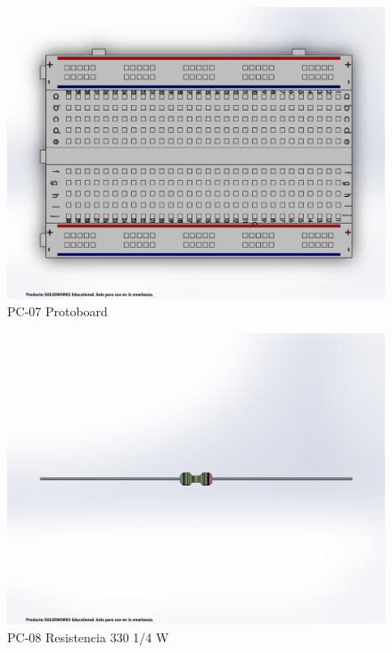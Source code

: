     \begin{figure}[H]
        \centering
        \includegraphics[trim = {1mm 10mm 1mm 1mm},clip,scale=0.2]{3/Img/protoboardFigura.PDF}
        \caption{PC-07 Protoboard}
        \label{fig:protoboardFigura}
    \end{figure}
    \begin{figure}[H]
        \centering
        \includegraphics[trim = {1mm 50mm 1mm 50mm},clip,scale=0.2]{3/Img/resistenciaFigura.pdf}
        \caption{PC-08 Resistencia 330 1/4 W}
        \label{fig:resistenciaFigura}
    \end{figure}
